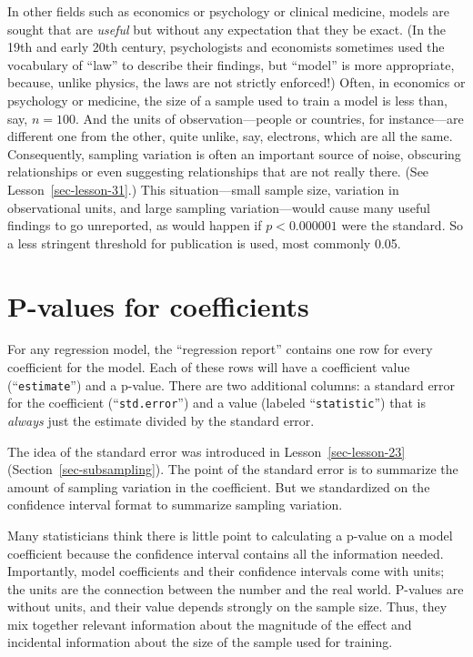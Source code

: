 \documentclass[
  letterpaper,
  DIV=11,
  numbers=noendperiod,
  oneside]{scrreprt}
\begin{document}
In other fields such as economics or psychology or clinical medicine,
models are sought that are \emph{useful} but without any expectation
that they be exact. (In the 19th and early 20th century, psychologists
and economists sometimes used the vocabulary of ``law'' to describe
their findings, but ``model'' is more appropriate, because, unlike
physics, the laws are not strictly enforced!) Often, in economics or
psychology or medicine, the size of a sample used to train a model is
less than, say, \(n=100\). And the units of observation---people or
countries, for instance---are different one from the other, quite
unlike, say, electrons, which are all the same. Consequently, sampling
variation is often an important source of noise, obscuring relationships
or even suggesting relationships that are not really there. (See
Lesson~\ref{sec-lesson-31}.) This situation---small sample size,
variation in observational units, and large sampling variation---would
cause many useful findings to go unreported, as would happen if
\(p < 0.000001\) were the standard. So a less stringent threshold for
publication is used, most commonly 0.05.

\hypertarget{p-values-for-coefficients}{%
\section{P-values for coefficients}\label{p-values-for-coefficients}}

For any regression model, the ``regression report'' contains one row for
every coefficient for the model. Each of these rows will have a
coefficient value (``\texttt{estimate}'') and a p-value. There are two
additional columns: a standard error for the coefficient
(``\texttt{std.error}'') and a value (labeled ``\texttt{statistic}'')
that is \emph{always} just the estimate divided by the standard error.

The idea of the standard error was introduced in
Lesson~\ref{sec-lesson-23} (Section~\ref{sec-subsampling}). The point of
the standard error is to summarize the amount of sampling variation in
the coefficient. But we standardized on the confidence interval format
to summarize sampling variation.

Many statisticians think there is little point to calculating a p-value
on a model coefficient because the confidence interval contains all the
information needed. Importantly, model coefficients and their confidence
intervals come with units; the units are the connection between the
number and the real world. P-values are without units, and their value
depends strongly on the sample size. Thus, they mix together relevant
information about the magnitude of the effect and incidental information
about the size of the sample used for training.
\end{document}
